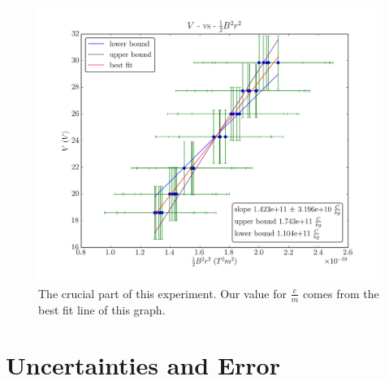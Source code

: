 \documentclass[aps,twocolumn,secnumarabic,amsmath,amssymb,nofootinbib]{revtex4-1}
\begin{document}
\begin{figure}[hb]
\includegraphics[width=\textwidth]{../images/e_over_m_8in.png}
\caption{The crucial part of this experiment. Our value for $\frac{e}{m}$ comes from the best fit line of this graph.}
\label{fig:e_over_m}
\end{figure}

\section{Uncertainties and Error}
\end{document}
